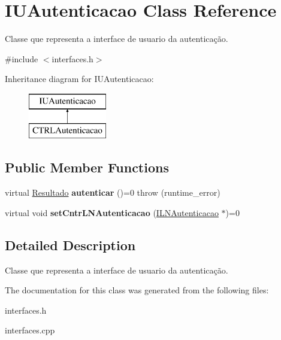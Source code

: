 \hypertarget{classIUAutenticacao}{}\section{I\+U\+Autenticacao Class Reference}
\label{classIUAutenticacao}


Classe que representa a interface de usuario da autenticação.  




{\ttfamily \#include $<$interfaces.\+h$>$}

Inheritance diagram for I\+U\+Autenticacao\+:\begin{figure}[H]
\begin{center}
\leavevmode
\includegraphics[height=2.000000cm]{classIUAutenticacao}
\end{center}
\end{figure}
\subsection*{Public Member Functions}
\begin{DoxyCompactItemize}
\item 
\mbox{\label{classIUAutenticacao_a8062316036c22694baa4dd6313efcaf1}} 
virtual \hyperlink{classResultado}{Resultado} {\bfseries autenticar} ()=0  throw (runtime\+\_\+error)
\item 
\mbox{\label{classIUAutenticacao_afaa4e4980ee10e2faaecb9ccfe524c61}} 
virtual void {\bfseries set\+Cntr\+L\+N\+Autenticacao} (\hyperlink{classILNAutenticacao}{I\+L\+N\+Autenticacao} $\ast$)=0
\end{DoxyCompactItemize}


\subsection{Detailed Description}
Classe que representa a interface de usuario da autenticação. 

The documentation for this class was generated from the following files\+:\begin{DoxyCompactItemize}
\item 
interfaces.\+h\item 
interfaces.\+cpp\end{DoxyCompactItemize}
